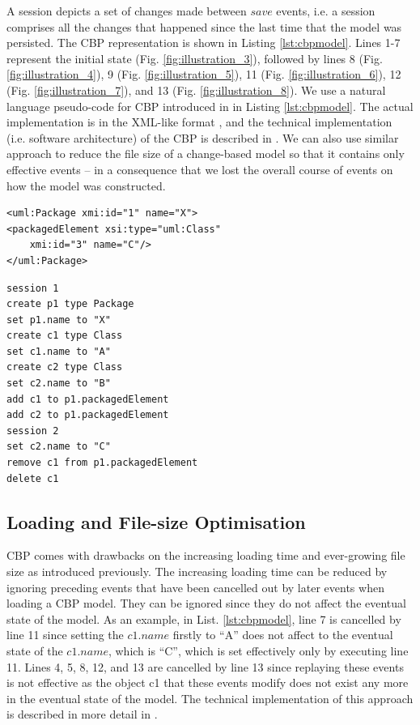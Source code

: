 \documentclass[sigplan,review,anonymous]{acmart}\settopmatter{printfolios=true,printccs=false,printacmref=false}
\begin{document}
A session depicts a set of changes made between $save$ events, i.e. a session comprises all the changes that happened since the last time that the model was persisted. The CBP representation is shown in Listing \ref{lst:cbpmodel}. Lines 1-7 represent the initial state (Fig. \ref{fig:illustration_3}), followed by lines 8 (Fig. \ref{fig:illustration_4}), 9 (Fig. \ref{fig:illustration_5}), 11 (Fig. \ref{fig:illustration_6}), 12 (Fig. \ref{fig:illustration_7}), and 13 (Fig. \ref{fig:illustration_8}). We use a natural language pseudo-code for CBP introduced in \cite{DBLP:conf/models/YohannisKP17,yohannis2018towards} in Listing \ref{lst:cbpmodel}. The actual implementation is in the XML-like format \cite{DBLP:conf/models/YohannisKP17}, and the technical implementation (i.e. software architecture) of the CBP is described in \cite{DBLP:conf/models/YohannisKP17}.  We can also use similar approach to reduce the file size of a change-based model so that it contains only effective events -- in a consequence that we lost the overall course of events on how the model was constructed.

\begin{lstlisting}[style=xmi,caption={The second version of the UML2 example model.},label=lst:xmimodel2]
<uml:Package xmi:id="1" name="X">
<packagedElement xsi:type="uml:Class" 
    xmi:id="3" name="C"/>
</uml:Package>
\end{lstlisting}

\begin{lstlisting}[style=eol,caption={The text CBP of producing state-based model in List. \ref{lst:xmimodel2}. Its visual illustration is in Fig. \ref{fig:illustration_cbp}.},label=lst:cbpmodel]
session 1
create p1 type Package
set p1.name to "X" 
create c1 type Class
set c1.name to "A"
create c2 type Class
set c2.name to "B"
add c1 to p1.packagedElement 
add c2 to p1.packagedElement
session 2
set c2.name to "C"
remove c1 from p1.packagedElement 
delete c1
\end{lstlisting}

\subsection{Loading and File-size Optimisation}
\label{sec:loading_and_file-size_optimisation}
CBP comes with drawbacks on the increasing loading time and ever-growing file size as introduced previously. The increasing loading time can be reduced by ignoring preceding events that have been cancelled out by later events when loading a CBP model. They can be ignored since they do not affect the eventual state of the model. As an example, in List. \ref{lst:cbpmodel}, line 7 is cancelled by line 11 since setting the $c1$.$name$ firstly to ``A'' does not affect to the eventual state of the $c1$.$name$, which is ``C'', which is set effectively only by executing line 11. Lines 4, 5, 8, 12, and 13 are cancelled by line 13 since replaying these events is not effective as the object c1 that these events modify does not exist any more in the eventual state of the model. The technical implementation of this approach is described in more detail in \cite{yohannis2018towards}.
\end{document}
